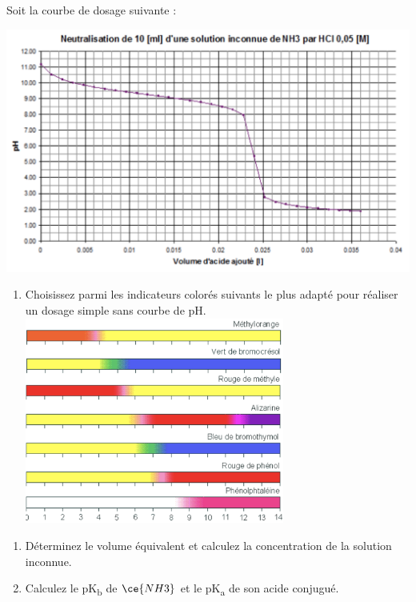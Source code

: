 \documentclass[
  11pt,
  a4paper,
  openany]{book}
\providecommand{\tightlist}{%
  \setlength{\itemsep}{0pt}\setlength{\parskip}{0pt}}
\begin{document}
\begin{Exercise}

Soit la courbe de dosage suivante :

\includegraphics[width=1\textwidth,height=\textheight]{images/acides-bases-ex-1.png}

\begin{enumerate}
\def\labelenumi{\alph{enumi}.}
\tightlist
\item
  Choisissez parmi les indicateurs colorés suivants le plus adapté pour réaliser un dosage simple sans courbe de pH.\\
  \includegraphics[width=0.67\textwidth,height=\textheight]{images/acides-bases-ex-2.png}
\end{enumerate}

\clearpage

\begin{enumerate}
\def\labelenumi{\alph{enumi}.}
\setcounter{enumi}{1}
\tightlist
\item
  Déterminez le volume équivalent et calculez la concentration de la solution inconnue.
\item
  Calculez le pK\textsubscript{b} de \(\ce{NH3}\) et le pK\textsubscript{a} de son acide conjugué.
\end{enumerate}

\end{Exercise}
\end{document}
